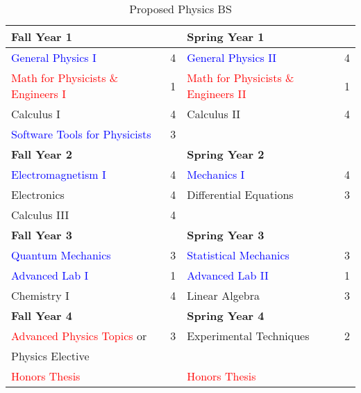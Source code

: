 \documentclass[12pt,preprint]{aastex}
\newcommand{\red}[1]{\textcolor{red}{#1}}
\newcommand{\blue}[1]{\textcolor{blue}{#1}}
\begin{document}
\begin{table}[h!]
\caption{Proposed Physics BS}
\medskip
\begin{tabular}{lclc}
\hline
{\bf Fall Year 1} &  & {\bf Spring Year 1} &  \\
\hline
\hline
\blue{General Physics I}       & 4 & \blue{General Physics II} & 4 \\
\red{Math for Physicists \& Engineers I}   & 1 & \red{Math for Physicists \& Engineers II} & 1 \\
Calculus I                    & 4 & Calculus II & 4 \\
\blue{Software Tools for Physicists} & 3 &   &  \medskip \\

\hline
{\bf Fall Year 2} &  & {\bf Spring Year 2} &  \\
\hline
\hline
\blue{Electromagnetism I}  & 4 & \blue{Mechanics I} & 4 \\
Electronics         & 4 & Differential Equations & 3 \\
Calculus III        & 4 &  \medskip \\
\hline
{\bf Fall Year 3} &  & {\bf Spring Year 3} &  \\
\hline
\hline
\blue{Quantum Mechanics} & 3 & \blue{Statistical Mechanics} & 3 \\
\blue{Advanced Lab I} & 1 & \blue{Advanced Lab II} & 1 \\
Chemistry I          & 4 & Linear Algebra & 3 \medskip \\
\hline
{\bf Fall Year 4} &  & {\bf Spring Year 4} &  \\
\hline
\hline
\red{Advanced Physics Topics} or & 3 & Experimental Techniques & 2 \\ 
\hspace{3mm} Physics Elective &   &  &  \\ 
\red{Honors Thesis} &   & \red{Honors Thesis} &   \\
\end{tabular}
\end{table}
\end{document}
